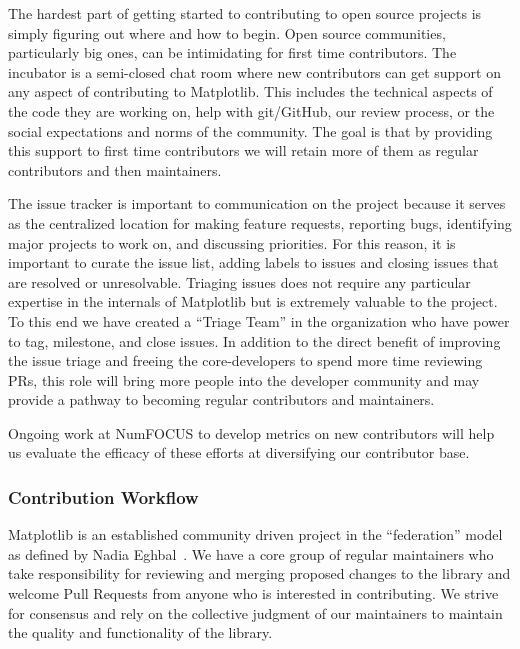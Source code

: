 \documentclass[12pt]{article}
\numberwithin{page}{section}
\begin{document}
The hardest part of getting started to contributing to open source
projects is simply figuring out where and how to begin.  Open source communities,
particularly big ones, can be intimidating for first time
contributors.  The incubator is a semi-closed chat room where new
contributors can get support on any aspect of contributing to
Matplotlib.  This includes the technical aspects of the code they are
working on, help with git/GitHub, our review process, or the social
expectations and norms of the community.  The goal is that by
providing this support to first time contributors we will retain more
of them as regular contributors and then maintainers.

The issue tracker is important to communication on the project because
it serves as the centralized location for making feature requests,
reporting bugs, identifying major projects to work on, and discussing
priorities.  For this reason, it is important to curate the issue
list, adding labels to issues and closing issues that are resolved or
unresolvable. Triaging issues does not require any particular
expertise in the internals of Matplotlib but is extremely valuable to
the project.  To this end we have created a ``Triage Team'' in the
organization who have power to tag, milestone, and close issues.  In
addition to the direct benefit of improving the issue triage and
freeing the core-developers to spend more time reviewing PRs, this
role will bring more people into the developer community and may
provide a pathway to becoming regular contributors and maintainers.

Ongoing work at NumFOCUS to develop metrics on new contributors
will help us evaluate the
efficacy of these efforts at diversifying our contributor base.

\subsubsection{Contribution Workflow}

Matplotlib is an established community driven project in the
``federation'' model as defined by Nadia Eghbal~\cite{eghbal_2020}.
We have a core group of regular maintainers who take responsibility for
reviewing and merging proposed changes to the library and welcome Pull
Requests from anyone who is interested in contributing.  We strive
for consensus and rely on the collective judgment of our maintainers
to maintain the quality and functionality of the library.
\end{document}
